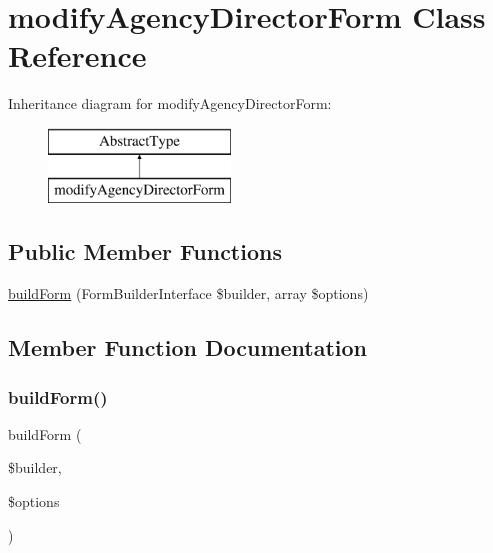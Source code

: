 \hypertarget{class_app_1_1_forms_1_1modify_agency_director_form}{}\section{modify\+Agency\+Director\+Form Class Reference}
\label{class_app_1_1_forms_1_1modify_agency_director_form}
Inheritance diagram for modify\+Agency\+Director\+Form\+:\begin{figure}[H]
\begin{center}
\leavevmode
\includegraphics[height=2.000000cm]{class_app_1_1_forms_1_1modify_agency_director_form}
\end{center}
\end{figure}
\subsection*{Public Member Functions}
\begin{DoxyCompactItemize}
\item 
\mbox{\hyperlink{class_app_1_1_forms_1_1modify_agency_director_form_a83c3745710374f9c5a1eb0686fe2dfab}{build\+Form}} (Form\+Builder\+Interface \$builder, array \$options)
\end{DoxyCompactItemize}


\subsection{Member Function Documentation}
\mbox{\label{class_app_1_1_forms_1_1modify_agency_director_form_a83c3745710374f9c5a1eb0686fe2dfab}} 
\subsubsection{\texorpdfstring{buildForm()}{buildForm()}}
{\footnotesize\ttfamily build\+Form (\begin{DoxyParamCaption}\item[{Form\+Builder\+Interface}]{\$builder,  }\item[{array}]{\$options }\end{DoxyParamCaption})}


